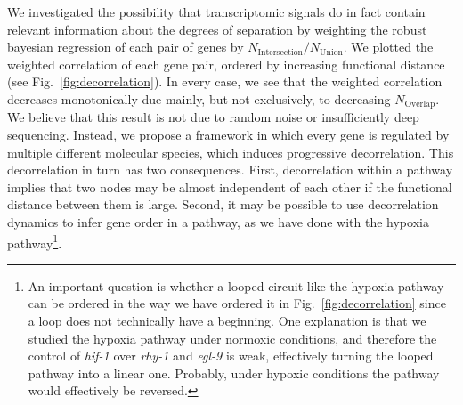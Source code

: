 \documentclass[9pt,twocolumn,twoside]{pnas-new}
\newcommand{\egl}{\emph{egl-9}}
\newcommand{\rhy}{\emph{rhy-1}}
\newcommand{\hif}{\emph{hif-1}}
\begin{document}
We investigated the possibility that transcriptomic signals do in fact contain
relevant information about the degrees of separation by weighting the robust
bayesian regression of each pair of genes by
$N_\mathrm{Intersection}/N_{\mathrm{Union}}$. We plotted the weighted
correlation of each gene pair, ordered by increasing functional distance
(see Fig.~\ref{fig:decorrelation}). In every case, we see that the weighted
correlation decreases monotonically due mainly, but not exclusively, to
decreasing $N_\mathrm{Overlap}$.
We believe that this result is not due to random noise or insufficiently deep
sequencing. Instead, we propose a framework in which every gene is regulated
by multiple different molecular species, which induces progressive decorrelation.
This decorrelation in turn has two consequences. First, decorrelation within a
pathway implies that two nodes may be almost independent of each other if the
functional distance between them is large. Second, it may be possible to use
decorrelation dynamics to infer gene order in a pathway, as we have done with
the hypoxia pathway\footnote{An important question is whether a looped circuit
like the hypoxia pathway can be ordered in the way we have ordered it in
Fig.~\ref{fig:decorrelation} since a loop does not technically have a beginning.
One explanation is that we studied the hypoxia pathway under normoxic conditions,
and therefore the control of \hif{} over \rhy{} and \egl{} is weak, effectively
turning the looped pathway into a linear one. Probably, under hypoxic conditions
the pathway would effectively be reversed.
}.
\end{document}

